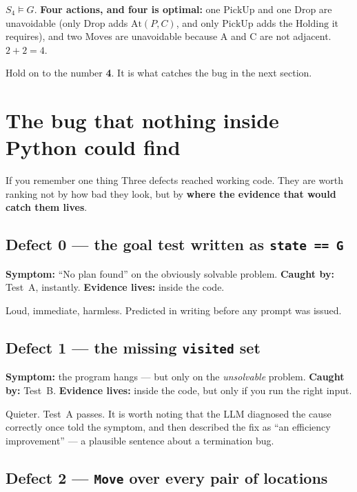 \documentclass[11pt,a4paper]{article}
\newcommand{\ent}{\models}
\begin{document}
$S_4 \ent G$. \textbf{Four actions, and four is optimal:} one $\mathrm{PickUp}$
and one $\mathrm{Drop}$ are unavoidable (only $\mathrm{Drop}$ adds
$\mathrm{At}(P,C)$, and only $\mathrm{PickUp}$ adds the $\mathrm{Holding}$ it
requires), and two $\mathrm{Move}$s are unavoidable because A and C are not
adjacent. $2 + 2 = 4$.

Hold on to the number \textbf{4}. It is what catches the bug in the next
section.

\section{The bug that nothing inside Python could find}

\begin{keyidea}{If you remember one thing}
Three defects reached working code. They are worth ranking not by how bad they
look, but by \textbf{where the evidence that would catch them lives}.
\end{keyidea}

\subsection{Defect 0 --- the goal test written as \texttt{state == G}}

\textbf{Symptom:} ``No plan found'' on the obviously solvable problem.
\textbf{Caught by:} Test~A, instantly. \textbf{Evidence lives:} inside the code.

Loud, immediate, harmless. Predicted in writing before any prompt was issued.

\subsection{Defect 1 --- the missing \texttt{visited} set}

\textbf{Symptom:} the program hangs --- but only on the \emph{unsolvable}
problem. \textbf{Caught by:} Test~B. \textbf{Evidence lives:} inside the code,
but only if you run the right input.

Quieter. Test~A passes. It is worth noting that the LLM diagnosed the cause
correctly once told the symptom, and then described the fix as ``an efficiency
improvement'' --- a plausible sentence about a termination bug.

\subsection{Defect 2 --- \texttt{Move} over every pair of locations}
\end{document}
